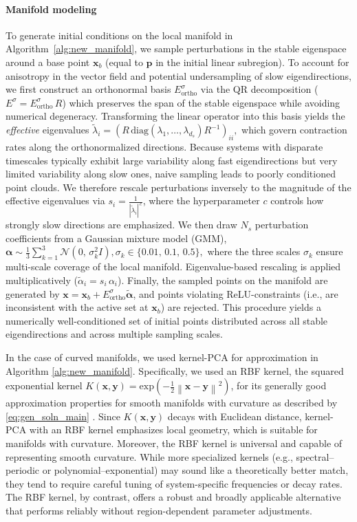 \documentclass{article}
\theoremstyle{example}
\theoremstyle{plain}
\theoremstyle{definition}
\theoremstyle{remark}
\def\vx{{\bm{x}}}
\def\vy{{\bm{y}}}
\newcommand\norm[1]{\left\lVert#1\right\rVert}
\begin{document}
\paragraph{Manifold modeling} 
To generate initial conditions on the local manifold in Algorithm~\ref{alg:new_manifold}, we sample perturbations in the stable eigenspace around a base point $\bm{x}_b$ (equal to $\bm{p}$ in the initial linear subregion). To account for anisotropy in the vector field and potential undersampling of slow eigendirections, we first construct an orthonormal basis $E_{\text{ortho}}^\sigma$ via the QR decomposition ($E^\sigma = E^\sigma_{\text{ortho}} \, R$) which preserves the span of the stable eigenspace while avoiding numerical degeneracy. Transforming the linear operator into this basis yields the \emph{effective} eigenvalues
$\tilde{\lambda}_i 
    = \left(R \, \mathrm{diag}(\lambda_1,\ldots,\lambda_{d_s}) R^{-1}\right)_{ii},
$
which govern contraction rates along the orthonormalized directions. 
Because systems with disparate timescales typically exhibit large variability along fast eigendirections but very limited variability along slow ones, naive sampling leads to poorly conditioned point clouds. We therefore rescale perturbations inversely to the magnitude of the effective eigenvalues via $s_i = \frac{1}{|\tilde{\lambda}_i|^{\,c}}$, where the hyperparameter $c$ controls how strongly slow directions are emphasized. 
We then draw $N_s$ perturbation coefficients from a Gaussian mixture model (GMM), $ \bm{\alpha} \sim \frac{1}{3}\sum_{k=1}^3 
    \mathcal{N}\!\left(0, \, \sigma_k^2 I\right),\sigma_k \in \{0.01,\, 0.1,\, 0.5\},$ where the three scales $\sigma_k$ ensure multi-scale coverage of the local manifold. Eigenvalue-based rescaling is applied multiplicatively ($\tilde{\alpha}_i = s_i \, \alpha_i$). 
Finally, the sampled points on the manifold are generated by
$\bm{x} = \bm{x}_b + E^\sigma_{\text{ortho}} \bm{\tilde{\alpha}}$, and points violating ReLU-constraints (i.e., are inconsistent with the active set at $\bm{x}_b$) are rejected. This procedure yields a numerically well-conditioned set of initial points distributed across all stable eigendirections and across multiple sampling scales.

In the case of curved manifolds, we used kernel-PCA \citep{scholkopf1998nonlinear} for approximation in Algorithm \ref{alg:new_manifold}. Specifically, we used an RBF kernel, the squared exponential kernel $K(\vx,\vy)=\text{exp} ({-\frac{1}{2}\norm{\vx-\vy}^2})$, for its generally good approximation properties for smooth manifolds with curvature as described by \ref{eq:gen_soln_main} \citep{hofmann2008kernel}. 
Since $K(\vx,\vy)$ decays with Euclidean distance, kernel-PCA with an RBF kernel emphasizes local geometry, which is suitable for manifolds with curvature. Moreover, the RBF kernel is universal and capable of representing smooth curvature. While more specialized kernels (e.g., spectral–periodic or polynomial–exponential) may sound like a theoretically better match, they tend to require careful tuning of system-specific frequencies or decay rates. The RBF kernel, by contrast, offers a robust and broadly applicable alternative that performs reliably without region-dependent parameter adjustments.
\end{document}
